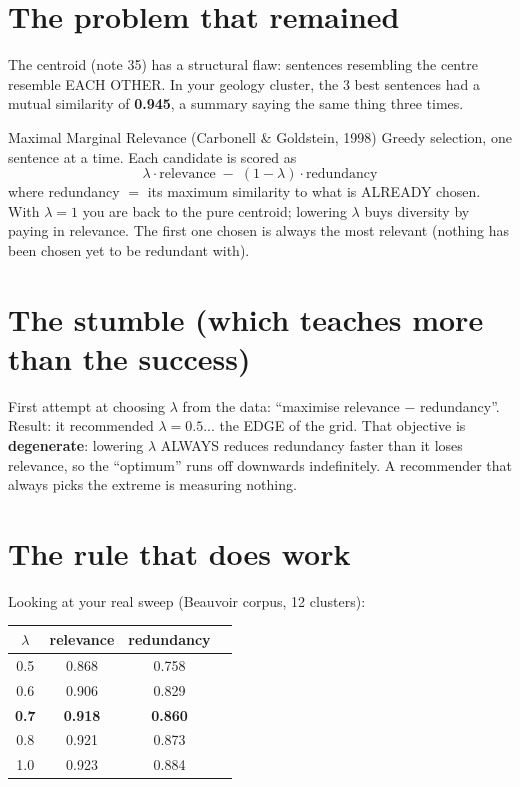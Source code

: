 \documentclass[11pt,a4paper]{article}
\begin{document}

\section{The problem that remained}

The centroid (note 35) has a structural flaw: sentences resembling the centre resemble EACH
OTHER. In your geology cluster, the 3 best sentences had a mutual similarity of \textbf{0.945},
a summary saying the same thing three times.

\begin{concepto}{Maximal Marginal Relevance (Carbonell \& Goldstein, 1998)}
Greedy selection, one sentence at a time. Each candidate is scored as
\[
\lambda \cdot \mathrm{relevance} \;-\; (1-\lambda) \cdot \mathrm{redundancy}
\]
where redundancy $=$ its maximum similarity to what is ALREADY chosen. With $\lambda = 1$ you
are back to the pure centroid; lowering $\lambda$ buys diversity by paying in relevance. The
first one chosen is always the most relevant (nothing has been chosen yet to be redundant
with).
\end{concepto}

\section{The stumble (which teaches more than the success)}

First attempt at choosing $\lambda$ from the data: ``maximise relevance $-$ redundancy''.
Result: it recommended $\lambda = 0.5$... the EDGE of the grid. That objective is
\textbf{degenerate}: lowering $\lambda$ ALWAYS reduces redundancy faster than it loses
relevance, so the ``optimum'' runs off downwards indefinitely. A recommender that always picks
the extreme is measuring nothing.

\section{The rule that does work}

Looking at your real sweep (Beauvoir corpus, 12 clusters):

\begin{center}
\begin{tabular}{cccc}
$\lambda$ & relevance & redundancy \\
\hline
0.5 & 0.868 & 0.758 \\
0.6 & 0.906 & 0.829 \\
\textbf{0.7} & \textbf{0.918} & \textbf{0.860} \\
0.8 & 0.921 & 0.873 \\
1.0 & 0.923 & 0.884 \\
\end{tabular}
\end{center}
\end{document}
